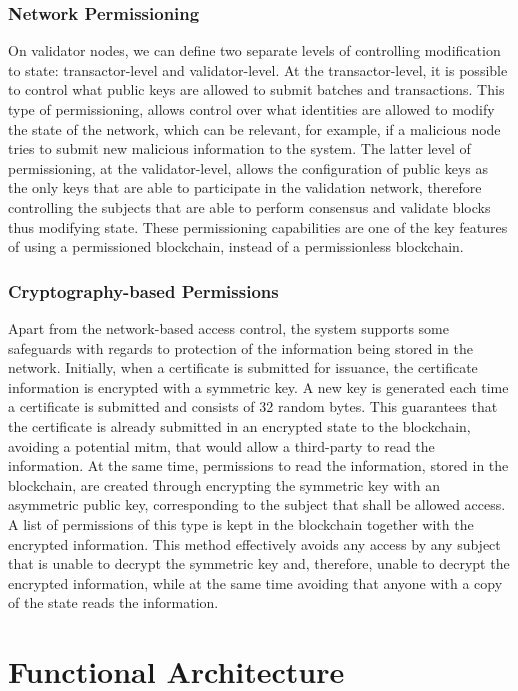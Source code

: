 \subsubsection{Network Permissioning}

On validator nodes, we can define two separate levels of controlling modification to state: transactor-level and validator-level. At the transactor-level, it is possible to control what public keys are allowed to submit batches and transactions. This type of permissioning, allows control over what identities are allowed to modify the state of the network, which can be relevant, for example, if a malicious node tries to submit new malicious information to the system. The latter level of permissioning, at the validator-level, allows the configuration of public keys as the only keys that are able to participate in the validation network, therefore controlling the subjects that are able to perform consensus and validate blocks thus modifying state. These permissioning capabilities are one of the key features of using a permissioned blockchain, instead of a permissionless blockchain.

\subsubsection{Cryptography-based Permissions}

Apart from the network-based access control, the system supports some safeguards with regards to protection of the information being stored in the network. Initially, when a certificate is submitted for issuance, the certificate information is encrypted with a symmetric key. A new key is generated each time a certificate is submitted and consists of 32 random bytes. This guarantees that the certificate is already submitted in an encrypted state to the blockchain, avoiding a potential \gls{mitm}, that would allow a third-party to read the information. At the same time, permissions to read the information, stored in the blockchain, are created through encrypting the symmetric key with an asymmetric public key, corresponding to the subject that shall be allowed access. A list of permissions of this type is kept in the blockchain together with the encrypted information. This method effectively avoids any access by any subject that is unable to decrypt the symmetric key and, therefore, unable to decrypt the encrypted information, while at the same time avoiding that anyone with a copy of the state reads the information.

\section{Functional Architecture}
\label{sec:design-interaction}

